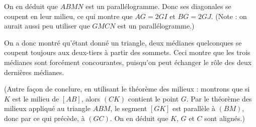 \begin{Soln}{47}
On en déduit que $ABMN$ est un parallélogramme. Donc ses diagonales se coupent en leur milieu, ce qui montre que $AG = 2GI$ et $BG = 2GJ$. (Note : on aurait aussi peu utiliser que $GMCN$ est un parallélogramme.)

On a donc montré qu'étant donné un triangle, deux médianes quelconques se coupent toujours aux deux-tiers à partir des sommets. Ceci montre que les trois médianes sont forcément concourantes, puisqu'on peut échanger le rôle des deux dernières médianes.

(Autre façon de conclure, en utilisant le théorème des milieux : montrons que si $K$ est le milieu de $[AB]$, alors $(CK)$ contient le point $G$. Par le théorème des milieux appliqué au triangle $ABM$, le segment $[GK]$ est parallèle à $(BM)$, donc par ce qui précède, à $(GC)$. On en déduit que $K$, $G$ et $C$ sont alignés.)
\end{Soln}
